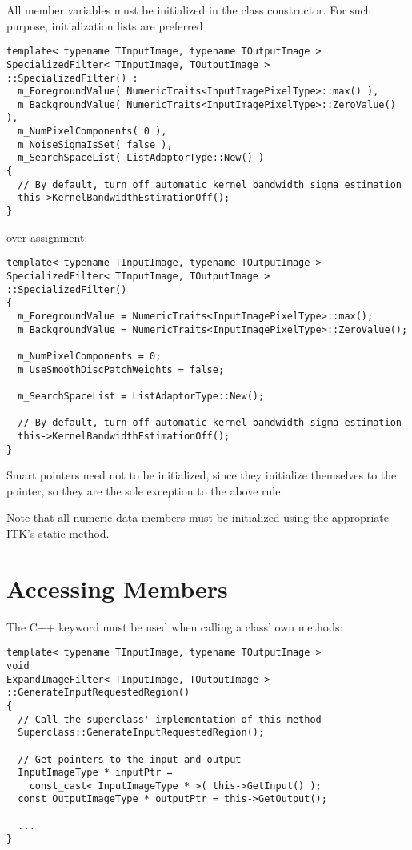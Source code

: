 All member variables must be initialized in the class constructor. For such
purpose, initialization lists are preferred

\small
\begin{verbatim}
template< typename TInputImage, typename TOutputImage >
SpecializedFilter< TInputImage, TOutputImage >
::SpecializedFilter() :
  m_ForegroundValue( NumericTraits<InputImagePixelType>::max() ),
  m_BackgroundValue( NumericTraits<InputImagePixelType>::ZeroValue() ),
  m_NumPixelComponents( 0 ),
  m_NoiseSigmaIsSet( false ),
  m_SearchSpaceList( ListAdaptorType::New() )
{
  // By default, turn off automatic kernel bandwidth sigma estimation
  this->KernelBandwidthEstimationOff();
}
\end{verbatim}
\normalsize

over assignment:

\small
\begin{verbatim}
template< typename TInputImage, typename TOutputImage >
SpecializedFilter< TInputImage, TOutputImage >
::SpecializedFilter()
{
  m_ForegroundValue = NumericTraits<InputImagePixelType>::max();
  m_BackgroundValue = NumericTraits<InputImagePixelType>::ZeroValue();

  m_NumPixelComponents = 0;
  m_UseSmoothDiscPatchWeights = false;

  m_SearchSpaceList = ListAdaptorType::New();

  // By default, turn off automatic kernel bandwidth sigma estimation
  this->KernelBandwidthEstimationOff();
}
\end{verbatim}
\normalsize

Smart pointers need not to be initialized, since they initialize themselves
to the  pointer, so they are the sole exception to the above rule.

Note that all numeric data members must be initialized using the appropriate
ITK's  static method.


\section{Accessing Members}
\label{sec:Accessing Members}

The C++ keyword  must be used when calling a class' own methods:

\small
\begin{verbatim}
template< typename TInputImage, typename TOutputImage >
void
ExpandImageFilter< TInputImage, TOutputImage >
::GenerateInputRequestedRegion()
{
  // Call the superclass' implementation of this method
  Superclass::GenerateInputRequestedRegion();

  // Get pointers to the input and output
  InputImageType * inputPtr =
    const_cast< InputImageType * >( this->GetInput() );
  const OutputImageType * outputPtr = this->GetOutput();

  ...
}
\end{verbatim}
\normalsize

